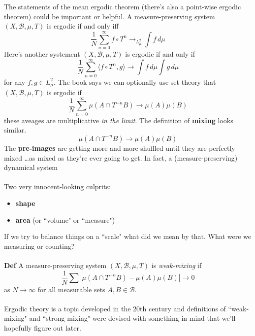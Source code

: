 \documentclass[12pt]{article}
\begin{document}
{\noindent The statements of the mean ergodic theorem (there's also a point-wise ergodic theorem) could be important or helpful. A measure-preserving system $(X, \mathcal{B}, \mu, T) $ is ergodic if and only iff 
$$ \frac{1}{N} \sum_{n=0}^\infty f \circ T^n \longrightarrow_{L^2_\mu} \int f \, d\mu $$
Here's another systement $(X, \mathcal{B}, \mu, T)$ is ergodic if and only if 
$$ \frac{1}{N} \sum_{n=0}^\infty \langle f \circ T^n, g \rangle \to \int f \, d\mu \int g \, d\mu $$
for any $f, g \in L^2_\mu$.  The book says we can optionally use set-theory that $(X, \mathcal{B}, \mu , T)$ is ergodic if 
$$ \frac{1}{N} \sum_{n=0}^\infty \mu (A \cap T^{-n} B) \to \mu(A) \mu(B) $$
these aveages are multiplicative \textit{in the limit}.  The definition of {\color{green!80!black}\textbf{mixing}} looks similar.
$$ \mu (A \cap T^{-n} B) \to \mu(A) \mu(B) $$
The \textbf{pre-images} are getting more and more shuffled until they are perfectly mixed \dots as mixed as they're ever going to get.  In fact, a (measure-preserving) dynamical system \\ \\
Two very innocent-looking culprits:
\begin{itemize}
\item \textbf{shape}
\item \textbf{area} (or ``volume" or ``measure")
\end{itemize}
If we try to balance things on a ``scale" what did we mean by that.  What were we measuring or counting? \\ \\
\textbf{Def} A measure-preserving system $(X, \mathcal{B}, \mu, T)$ is \textit{weak-mixing} if 
$$ \frac{1}{N} \sum |\mu(A \cap T^{-n} B)  - \mu(A) \mu(B)| \to 0 $$
as $N \to \infty$ for all measurable sets $A, B \in \mathcal{B}$. \\ \\
Ergodic theory is a topic developed in the 20th century and definitions of ``weak-mixing" and ``strong-mixing" were devised with something in mind that we'll hopefully figure out later.

\newpage

}
\end{document}
